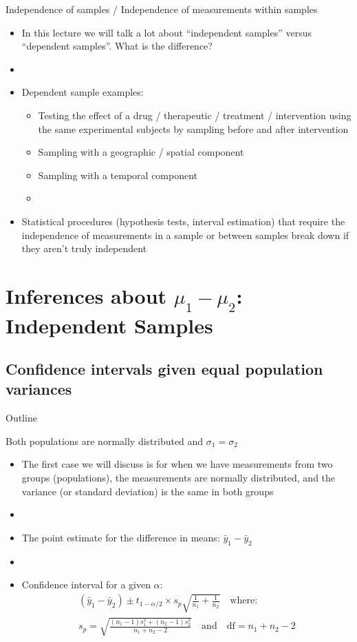 \documentclass[xcolor=dvipsnames]{beamer}
\begin{document}
\begin{frame}{Independence of samples / Independence of measurements within samples}
	\begin{itemize}
		\item In this lecture we will talk a lot about ``independent samples'' versus ``dependent samples''. What is the difference?	
		\item[]
		\item Dependent sample examples:
		\begin{itemize}
			\item Testing the effect of a drug / therapeutic / treatment / intervention using the same experimental subjects by sampling before and after intervention
			\item Sampling with a geographic / spatial component
			\item Sampling with a temporal component 
			\item[]
		\end{itemize}
		\item Statistical procedures (hypothesis tests, interval estimation) that require the independence of measurements in a sample or between samples break down if they aren't truly independent
	\end{itemize}
\end{frame}

\section{Inferences about $\mu_1 - \mu_2$: Independent Samples}
\subsection{Confidence intervals given equal population variances}
\begin{frame}{Outline}
\tableofcontents[currentsection,subsectionstyle=show/shaded/hide]
\end{frame}

\begin{frame}{Both populations are normally distributed and $\sigma_1 = \sigma_2$}
	\begin{itemize}
		\item The first case we will discuss is for when we have measurements from two groups (populations), the measurements are normally distributed, and the variance (or standard deviation) is the same in both groups
		\item[]
		\item The point estimate for the difference in means: $\bar{y}_1 - \bar{y}_2$
		\item[]
		\item Confidence interval for a given $\alpha$:
		\begin{gather*}
			(\bar{y}_1 - \bar{y}_2) \pm t_{1-\alpha /2} \times s_p \sqrt{\frac{1}{n_1} + \frac{1}{n_2}} \quad \text{where:} \\
			s_p = \sqrt{\frac{(n_1 -1)s_1^2 + (n_2-1)s_2^2}{n_1 + n_2 -2}} \quad \text{and} \quad \text{df} = n_1 + n_2 -2
		\end{gather*}
	\end{itemize}
\end{frame}
\end{document}
